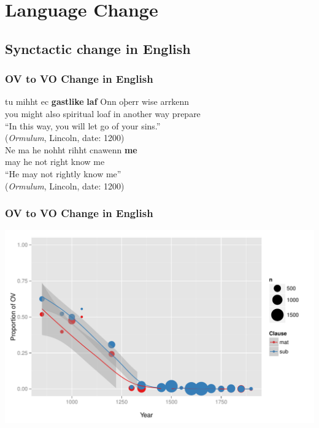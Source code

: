 \documentclass[hyperref={pdfpagelabels=false}]{beamer}
\begin{document}
\section{Language Change}
\subsection{Synctactic change in English}
\begin{frame}
\frametitle{OV to VO Change in English}
\begin{exe} 
	
	\ex \gll tu mihht ec \textbf{gastlike} \textbf{laf} Onn oþerr wise \textyogh arrkenn\\
	you might also spiritual loaf in another way prepare\\
	\quad ``In this way, you will let go of your sins.''\\
	(\textsl{Ormulum}, Lincoln, date: 1200)\\
	\vspace*{5mm}
	\ex \gll Ne {ma\textyogh \textyogh}  he nohht rihht cnawenn \textbf{me}\\
	 may he not right know me\\
	\quad ``He may not rightly know me''\\
	(\textsl{Ormulum}, Lincoln, date: 1200)
	
\end{exe}

\end{frame}

\begin{frame} 
\frametitle{OV to VO Change in English} %
\begin{center}
	\includegraphics[scale=.6]{myovvoBinnedLoess.pdf}
\end{center}
\end{frame}
\end{document}
